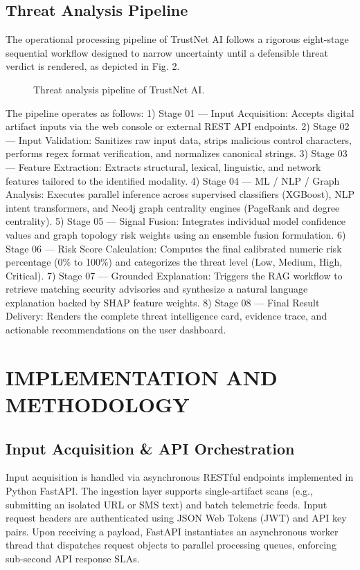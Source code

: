 \documentclass[conference,a4paper]{IEEEtran}
\begin{document}
\subsection{Threat Analysis Pipeline}
The operational processing pipeline of TrustNet AI follows a rigorous eight-stage sequential workflow designed to narrow uncertainty until a defensible threat verdict is rendered, as depicted in Fig. 2.

\begin{figure}[h]
\centering
\fbox{\rule{0pt}{1in} \rule{0.9\linewidth}{0pt}}
\caption{Threat analysis pipeline of TrustNet AI.}
\end{figure}

The pipeline operates as follows:
1) Stage 01 — Input Acquisition: Accepts digital artifact inputs via the web console or external REST API endpoints.
2) Stage 02 — Input Validation: Sanitizes raw input data, strips malicious control characters, performs regex format verification, and normalizes canonical strings.
3) Stage 03 — Feature Extraction: Extracts structural, lexical, linguistic, and network features tailored to the identified modality.
4) Stage 04 — ML / NLP / Graph Analysis: Executes parallel inference across supervised classifiers (XGBoost), NLP intent transformers, and Neo4j graph centrality engines (PageRank and degree centrality).
5) Stage 05 — Signal Fusion: Integrates individual model confidence values and graph topology risk weights using an ensemble fusion formulation.
6) Stage 06 — Risk Score Calculation: Computes the final calibrated numeric risk percentage (0\% to 100\%) and categorizes the threat level (Low, Medium, High, Critical).
7) Stage 07 — Grounded Explanation: Triggers the RAG workflow to retrieve matching security advisories and synthesize a natural language explanation backed by SHAP feature weights.
8) Stage 08 — Final Result Delivery: Renders the complete threat intelligence card, evidence trace, and actionable recommendations on the user dashboard.

\section{IMPLEMENTATION AND METHODOLOGY}
\subsection{Input Acquisition \& API Orchestration}
Input acquisition is handled via asynchronous RESTful endpoints implemented in Python FastAPI. The ingestion layer supports single-artifact scans (e.g., submitting an isolated URL or SMS text) and batch telemetric feeds. Input request headers are authenticated using JSON Web Tokens (JWT) and API key pairs. Upon receiving a payload, FastAPI instantiates an asynchronous worker thread that dispatches request objects to parallel processing queues, enforcing sub-second API response SLAs.
\end{document}

